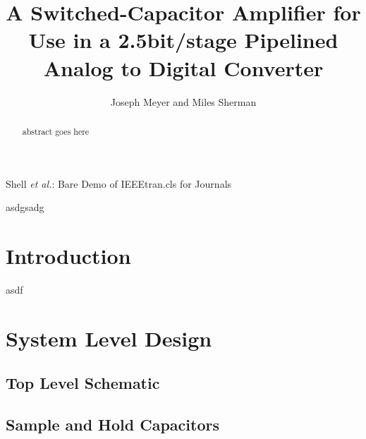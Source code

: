\documentclass[journal]{IEEEtran}
\begin{document}
\title{A Switched-Capacitor Amplifier for Use in a 2.5bit/stage Pipelined Analog to Digital Converter }

\author{Joseph Meyer and Miles Sherman}

%
{Shell \MakeLowercase{\textit{et al.}}: Bare Demo of IEEEtran.cls for Journals}

\maketitle

\begin{abstract}
abstract goes here
\end{abstract}

\begin{IEEEkeywords}
asdgsadg
\end{IEEEkeywords}

\section{Introduction}
% 
% 
% 
% 
asdf

\section{System Level Design}
\subsection{Top Level Schematic}

\subsection{Sample and Hold Capacitors}
\end{document}
